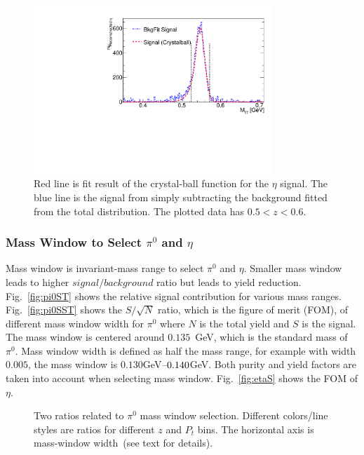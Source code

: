 \begin{figure}[H]
\centering
\includegraphics[width=0.8\textwidth,natwidth=610,natheight=642]{figure_dataselection/eta_Signal_Z_4.pdf}
\caption{Red line is fit result of the crystal-ball function for the $\eta$ signal. The blue line is the signal from simply subtracting the background fitted from the total distribution. The plotted data has $0.5<z<0.6$.}
\label{fig:etasignal}
\end{figure}

\subsubsection{\texorpdfstring{Mass Window to Select $\pi^0$ and $\eta$}{Mass Window to Select pi0 and eta}}
\label{sec:masswindow}
Mass window is invariant-mass range to select $\pi^0$ and $\eta$. Smaller mass window leads to higher $signal/background$ ratio but leads to yield reduction. Fig.~\ref{fig:pi0ST} shows the relative signal contribution for various mass ranges. Fig.~\ref{fig:pi0SST} shows the $S/\sqrt{N}$ ratio, which is the figure of merit (FOM), of different mass window width for $\pi^0$ where $N$ is the total yield and $S$ is the signal. The mass window is centered around $0.135$~GeV, which is the standard mass of  $\pi^0$. Mass window width is defined as half the mass range, for example with width $0.005$, the mass window is $0.130$GeV$\textup{--}0.140$GeV. Both purity and yield factors are taken into account when selecting mass window. Fig.~\ref{fig:etaS} shows the FOM of $\eta$.
\begin{figure}[h]
\centering     %
{}
\caption{Two ratios related to $\pi^0$ mass window selection. Different colors/line styles are ratios for different $z$ and $P_t$ bins. The horizontal axis is mass-window width~(see text for details).}
\label{fig:pi0S}
\end{figure}

